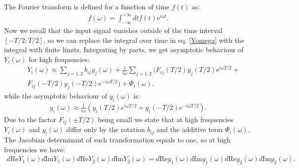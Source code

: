\documentclass{article}
\begin{document}
The Fourier transform is defined for a function of time $f(t)$ as:
\begin{eqnarray}
    f(\omega)=\int_{-\infty}^{+\infty} dt f(t) \textrm{e}^{i\omega t}.
\end{eqnarray}
Now we recall that the input signal vanishes outside of the time interval $[-T/2;T/2]$, so we can replace the integral over time in eq. \eqref{Yomega} with the integral with finite limits. Integrating by parts, we get asymptotic behaviour of $Y_{i}(\omega)$ for high frequencies: 
\begin{eqnarray}
    &&Y_{i}(\omega) \approx \sum_{j=1,2}b_{ij}y_{j}(\omega) + \frac{1}{i\omega}\sum_{j=1,2}\Big(F_{ij}(T/2)y_{j}(T/2)\textrm{e}^{i\omega T/2}+\nonumber\\
    &&F_{ij}(-T/2)y_{j}(-T/2)\textrm{e}^{-i\omega T/2}\Big) + \Phi_{i}(\omega),
\end{eqnarray}
while the asymptotic behaviour of $y_{i}(\omega)$ is:
\begin{eqnarray}
    y_{i}(\omega) \approx \frac{1}{i\omega}\left(y_{i}(T/2)e^{i\omega T/2}+y_{i}(-T/2)e^{-i\omega T/2}\right).
\end{eqnarray}
Due to the factor $F_{ij}(\pm T/2)$ being small we state that at high frequencies $Y_{i}(\omega)$ and $y_{i}(\omega)$ differ only by the rotation $b_{ij}$ and the additive term $\Phi_{i}(\omega)$. The Jacobian determinant of such transformation equals to one, so at high frequencies we have:
\begin{align}
    d\textrm{Re}Y_{1}(\omega)d\textrm{Im}Y_{1}(\omega)d\textrm{Re}Y_{2}(\omega)d\textrm{Im}Y_{2}(\omega) = d\textrm{Re}y_{1}(\omega)d\textrm{Im}y_{1}(\omega)d\textrm{Re}y_{2}(\omega)d\textrm{Im}y_{2}(\omega).
\end{align}
\end{document}
